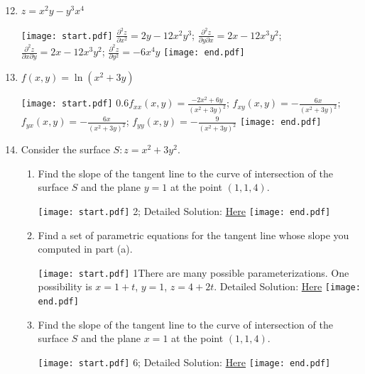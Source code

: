 \documentclass[12pt]{article}
\begin{document}
\begin{enumerate}
\setcounter{enumi}{11}

\item $z=x^2y-y^3x^4$ 

\texttt{[image: start.pdf]}
{{$\frac{\partial^2z}{\partial x^2}=2y-12x^2y^3$; $\frac{\partial^2z}{\partial y \partial x}=2x-12x^3y^2$; $\frac{\partial^2z}{\partial x \partial y}=2x-12x^3y^2$; $\frac{\partial^2z}{\partial y^2}=-6x^4y$}}
\texttt{[image: end.pdf]}


\item $f(x,y)=\ln{(x^2+3y)}$ 

\texttt{[image: start.pdf]}
{{{0.6\linewidth}{$f_{xx}(x,y)=\frac{-2x^2+6y}{(x^2+3y)^2}$; $f_{xy}(x,y)=-\frac{6x}{(x^2+3y)^2}$;\\ $f_{yx}(x,y)=-\frac{6x}{(x^2+3y)^2}$; $f_{yy}(x,y)=-\frac{9}{(x^2+3y)^2}$}}}
\texttt{[image: end.pdf]}


\item Consider the surface $S: z=x^2+3y^2$.  

\begin{enumerate}

\item Find the slope of the tangent line to the curve of intersection of the surface $S$ and the plane $y=1$ at the point $(1,1,4)$.

\texttt{[image: start.pdf]}
{{2; Detailed Solution: \textcolor{blue}{\href{http://www.math.drexel.edu/classes/Calculus/resources/Math200HW/Solutions/10_200_Partial_14.pdf}{Here}} }}
\texttt{[image: end.pdf]}


\item Find a set of parametric equations for the tangent line whose slope you computed in part (a).  

\texttt{[image: start.pdf]}
{{{1\linewidth}{There are many possible parameterizations.  One possibility is $x=1+t$, $y=1$, $z=4+2t$. Detailed Solution: \textcolor{blue}{\href{http://www.math.drexel.edu/classes/Calculus/resources/Math200HW/Solutions/10_200_Partial_14.pdf}{Here}} }}}
\texttt{[image: end.pdf]}


\item Find the slope of the tangent line to the curve of intersection of the surface $S$ and the plane $x=1$ at the point $(1,1,4)$.

\texttt{[image: start.pdf]}
{{6; Detailed Solution: \textcolor{blue}{\href{http://www.math.drexel.edu/classes/Calculus/resources/Math200HW/Solutions/10_200_Partial_14.pdf}{Here}} }}
\texttt{[image: end.pdf]}



\end{enumerate}
\end{enumerate}
\end{document}
